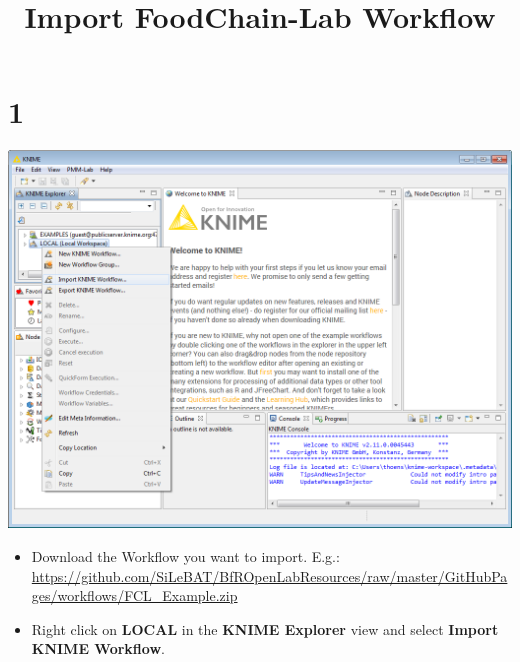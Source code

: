 \documentclass{beamer}
\title{Import FoodChain-Lab Workflow}
\date{}
\begin{document}
\maketitle
 
\section{1}
\begin{frame}
	\begin{center}
  		\includegraphics[height=0.6\textheight]{1.png}
	\end{center}
	\begin{itemize}
		\item Download the Workflow you want to import. E.g.: \url{https://github.com/SiLeBAT/BfROpenLabResources/raw/master/GitHubPages/workflows/FCL_Example.zip}
		\item Right click on \textbf{LOCAL} in the \textbf{KNIME Explorer} view and select \textbf{Import KNIME Workflow}.
	\end{itemize}
\end{frame}
\end{document}
